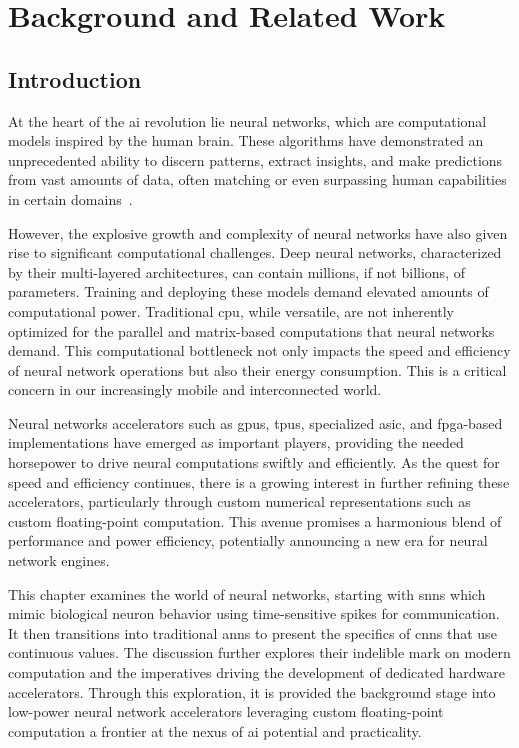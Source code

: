 \chapter{Background and Related Work}\label{chap.background}
\minitoc
\section{Introduction}
At the heart of the \gls{ai} revolution lie neural networks, which are computational models inspired by the human brain. These algorithms have demonstrated an unprecedented ability to discern patterns, extract insights, and make predictions from vast amounts of data, often matching or even surpassing human capabilities in certain domains~\cite{silver2016mastering, gulshan2016development, lake2015human, xiong2016achieving, brown2020language}.

However, the explosive growth and complexity of neural networks have also given rise to significant computational challenges. Deep neural networks, characterized by their multi-layered architectures, can contain millions, if not billions, of parameters. Training and deploying these models demand elevated amounts of computational power. Traditional \gls{cpu}, while versatile, are not inherently optimized for the parallel and matrix-based computations that neural networks demand. This computational bottleneck not only impacts the speed and efficiency of neural network operations but also their energy consumption. This is a critical concern in our increasingly mobile and interconnected world.

Neural networks accelerators such as \glspl{gpu}, \glspl{tpu}, specialized \gls{asic}, and \gls{fpga}-based implementations have emerged as important players, providing the needed horsepower to drive neural computations swiftly and efficiently. As the quest for speed and efficiency continues, there is a growing interest in further refining these accelerators, particularly through custom numerical representations such as custom floating-point computation. This avenue promises a harmonious blend of performance and power efficiency, potentially announcing a new era for neural network engines.

This chapter examines the world of neural networks, starting with \glspl{snn} which mimic biological neuron behavior using time-sensitive spikes for communication. It then transitions into traditional \glspl{ann} to present the specifics of \glspl{cnn} that use continuous values. The discussion further explores their indelible mark on modern computation and the imperatives driving the development of dedicated hardware accelerators. Through this exploration, it is provided the background stage into low-power neural network accelerators leveraging custom floating-point computation a frontier at the nexus of \gls{ai} potential and practicality.

